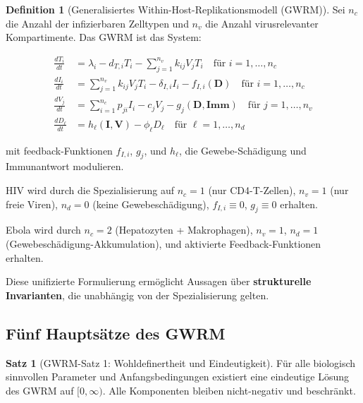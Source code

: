 ﻿\documentclass[a4paper,12pt]{article}
\theoremstyle{definition}
\newtheorem{definition}{Definition}
\newtheorem{satz}{Satz}
\begin{document}
\begin{definition}[Generalisiertes Within-Host-Replikationsmodell (GWRM)]
Sei $n_c$ die Anzahl der infizierbaren Zelltypen und $n_v$ die Anzahl virusrelevanter Kompartimente. Das GWRM ist das System:

\begin{align}
\frac{dT_i}{dt} &= \lambda_i - d_{T,i} T_i - \sum_{j=1}^{n_v} k_{ij} V_j T_i \quad \text{für } i=1,\ldots,n_c \label{eq:gwrm_t}\\
\frac{dI_i}{dt} &= \sum_{j=1}^{n_v} k_{ij} V_j T_i - \delta_{I,i} I_i - f_{I,i}(\mathbf{D}) \quad \text{für } i=1,\ldots,n_c \label{eq:gwrm_i}\\
\frac{dV_j}{dt} &= \sum_{i=1}^{n_c} p_{ji} I_i - c_j V_j - g_j(\mathbf{D}, \mathbf{Imm}) \quad \text{für } j=1,\ldots,n_v \label{eq:gwrm_v}\\
\frac{dD_\ell}{dt} &= h_\ell(\mathbf{I}, \mathbf{V}) - \phi_\ell D_\ell \quad \text{für } \ell = 1, \ldots, n_d \label{eq:gwrm_d}
\end{align}

mit feedback-Funktionen $f_{I,i}$, $g_j$, und $h_\ell$, die Gewebe-Schädigung und Immunantwort modulieren.

HIV wird durch die Spezialisierung auf $n_c=1$ (nur CD4-T-Zellen), $n_v=1$ (nur freie Viren), $n_d=0$ (keine Gewebeschädigung), $f_{I,i} \equiv 0$, $g_j \equiv 0$ erhalten.

Ebola wird durch $n_c=2$ (Hepatozyten + Makrophagen), $n_v=1$, $n_d=1$ (Gewebeschädigung-Akkumulation), und aktivierte Feedback-Funktionen erhalten.
\end{definition}

Diese unifizierte Formulierung ermöglicht Aussagen über \textbf{strukturelle Invarianten}, die unabhängig von der Spezialisierung gelten.

\subsection{Fünf Hauptsätze des GWRM}

\begin{satz}[GWRM-Satz 1: Wohldefinertheit und Eindeutigkeit]
Für alle biologisch sinnvollen Parameter und Anfangsbedingungen existiert eine eindeutige Lösung des GWRM auf $[0, \infty)$. Alle Komponenten bleiben nicht-negativ und beschränkt.
\end{satz}
\end{document}
